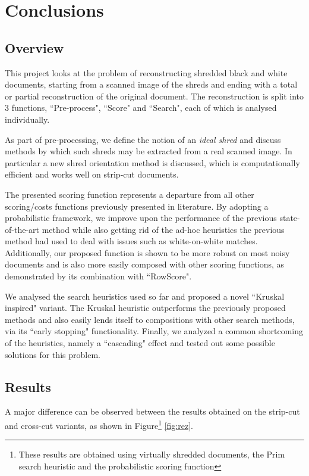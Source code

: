 \chapter{Conclusions}
\label{chap7}

\section{Overview}
This project looks at the problem of reconstructing shredded black and white documents, starting from a scanned image of the shreds and ending with a total or partial reconstruction of the original document. The reconstruction is split into 3 functions, ``Pre-process", ``Score" and ``Search", each of which is analysed individually. 

As part of pre-processing, we define the notion of an \emph{ideal shred} and discuss methods by which such shreds may be extracted from a real scanned image. In particular a new shred orientation method is discussed, which is computationally efficient and works well on strip-cut documents. 

The presented scoring function represents a departure from all other scoring/costs functions previously presented in literature. By adopting a probabilistic framework, we improve upon the performance of the previous state-of-the-art method while also getting rid of the ad-hoc heuristics the previous method had used to deal with issues such as white-on-white matches. Additionally, our proposed function is shown to be more robust on most noisy documents and is also more easily composed with other scoring functions, as demonstrated by its combination with ``RowScore".

We analysed the search heuristics used so far and proposed a novel ``Kruskal inspired" variant. The Kruskal heuristic outperforms the previously proposed methods and also easily lends itself to compositions with other search methods, via its ``early stopping" functionality. Finally, we analyzed a common shortcoming of the heuristics, namely a ``cascading" effect and tested out some possible solutions for this problem.

\section{Results}
\label{chap7Rez}
A major difference can be observed between the results obtained on the strip-cut and cross-cut variants, as shown in Figure\footnote{These results are obtained using virtually shredded documents, the Prim search heuristic and the probabilistic scoring function} \ref{fig:rez}.


